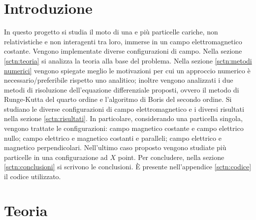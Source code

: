 \documentclass[10pt,a4paper]{article}
\begin{document}
\section{Introduzione}

In questo progetto si studia il moto di una e più particelle cariche, non relativistiche e non interagenti tra loro, immerse in un campo elettromagnetico costante. Vengono implementate diverse configurazioni di campo. Nella sezione \ref{sctn:teoria} si analizza la teoria alla base del problema. Nella sezione \ref{sctn:metodi numerici} vengono spiegate meglio le motivazioni per cui un approccio numerico è necessario/preferibile rispetto uno analitico; inoltre vengono analizzati i due metodi di risoluzione dell'equazione differenziale proposti, ovvero il metodo di Runge-Kutta del quarto ordine e l'algoritmo di Boris del secondo ordine. Si studiano le diverse configurazioni di campo elettromagnetico e i diversi risultati nella sezione \ref{sctn:risultati}. In particolare, considerando una particella singola, vengono trattate le configurazioni: campo magnetico costante e campo elettrico nullo; campo elettrico e magnetico costanti e paralleli; campo elettrico e magnetico perpendicolari. Nell'ultimo caso proposto vengono studiate più particelle in una configurazione ad $X$ point. Per concludere, nella sezione \ref{sctn:conclusioni} si scrivono le conclusioni. È presente nell'appendice \ref{sctn:codice} il codice utilizzato.


\section{Teoria\label{sctn:teoria}}
\end{document}
